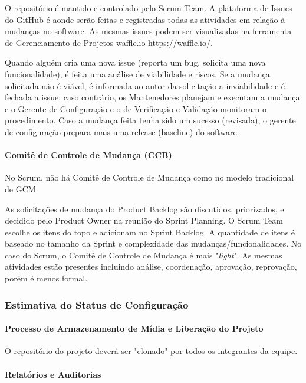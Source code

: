 O repositório é mantido e controlado pelo Scrum Team. A plataforma de Issues do GitHub é aonde serão feitas e registradas todas as atividades em relação à mudanças no software. As mesmas issues podem ser visualizadas na ferramenta de Gerenciamento de Projetos waffle.io \url{https://waffle.io/}.

Quando alguém cria uma nova issue (reporta um bug, solicita uma nova funcionalidade), é feita uma análise de viabilidade e riscos. Se a mudança solicitada não é viável, é informada ao autor da solicitação a inviabilidade e é fechada a issue; caso contrário, os Mantenedores planejam e executam a mudança e o Gerente de Configuração e o de Verificação e Validação monitoram o procedimento. Caso a mudança feita tenha sido um sucesso (revisada), o gerente de configuração prepara mais uma release (baseline) do software.

\paragraph{Comitê de Controle de Mudança (CCB)}

No Scrum, não há Comitê de Controle de Mudança como no modelo tradicional de GCM.

As solicitações de mudança do Product Backlog são discutidos, priorizados, e decidido pelo Product Owner na reunião do Sprint Planning. O Scrum Team escolhe os itens do topo e adicionam no Sprint Backlog. A quantidade de itens é baseado no tamanho da Sprint e complexidade das mudanças/funcionalidades. No caso do Scrum, o Comitê de Controle de Mudança é mais "\textit{light}". As mesmas atividades estão presentes incluindo análise, coordenação, aprovação, reprovação, porém é menos formal.


\subsubsection{Estimativa do Status de Configuração}

\paragraph{Processo de Armazenamento de Mídia e Liberação do Projeto}

O repositório do projeto deverá ser "clonado" por todos os integrantes da equipe.

\paragraph{Relatórios e Auditorias}


